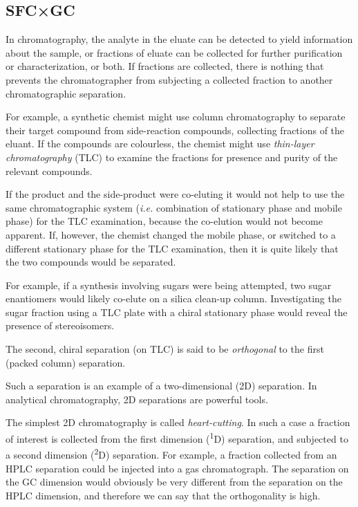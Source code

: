 \subsection{SFC×GC}
\label{sec:SFCxGC}
In chromatography, the analyte in the eluate can be detected to yield
information about the sample, or fractions of eluate can be collected for
further purification or characterization, or both. If fractions are collected,
there is nothing that prevents the chromatographer from subjecting a collected
fraction to another chromatographic separation.

For example, a synthetic chemist might use column chromatography to separate
their target compound from side-reaction compounds, collecting fractions of the
eluant. If the compounds are colourless, the chemist might use
\textit{thin-layer chromatography} (TLC) to examine the fractions for presence
and purity of the relevant compounds.

If the product and the side-product were co-eluting it would not help to use the
same chromatographic system (\textit{i.e.} combination of stationary phase and
mobile phase) for the TLC examination, because the co-elution would not become
apparent. If, however, the chemist changed the mobile phase, or switched to a
different stationary phase for the TLC examination, then it is quite likely that
the two compounds would be separated. 

For example, if a synthesis involving sugars were being attempted, two sugar
enantiomers would likely co-elute on a silica clean-up column. Investigating the
sugar fraction using a TLC plate with a chiral stationary phase
would reveal the presence of stereoisomers.

The second, chiral separation (on TLC) is said to be \textit{orthogonal} to the
first (packed column) separation.

Such a separation is an example of a two-dimensional (2D) separation. In
analytical chromatography, 2D separations are powerful tools.

The simplest 2D chromatography is called \textit{heart-cutting}. In such a case
a fraction of interest is collected from the first dimension
(\textsuperscript{1}D) separation, and subjected to a second dimension
(\textsuperscript{2}D) separation. For example, a fraction collected from an
HPLC separation could be injected into a gas chromatograph. The separation on
the GC dimension would obviously be very different from the separation on the
HPLC dimension, and therefore we can say that the orthogonality is high.

